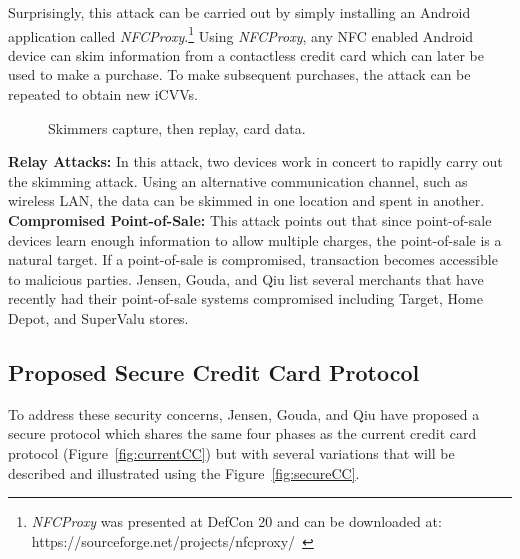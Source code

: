 \documentclass{sig-alternate}
\begin{document}
Surprisingly, this attack can be carried out by simply installing an Android application called \textit{NFCProxy}.\footnote{\textit{NFCProxy} was presented at DefCon 20 and can be downloaded at: https://sourceforge.net/projects/nfcproxy/~\cite{CC2016}}
Using \textit{NFCProxy}, any NFC enabled Android device can skim information from a contactless credit card which can later be used to make a purchase. To make subsequent purchases, the attack can be repeated to obtain new iCVVs.
\begin{figure}
\centering
{}
\caption{Skimmers capture, then replay, card data.~\cite{CC2016}}
\label{fig:skim}
\end{figure}
\vspace{2mm}\newline
\noindent\textbf{Relay Attacks:}
In this attack, two devices work in concert to rapidly carry out the skimming attack. Using an alternative communication channel, such as wireless LAN, the data can be skimmed in one location and spent in another.
\vspace{2mm}\newline
\noindent\textbf{Compromised Point-of-Sale:}
This attack points out that since point-of-sale devices learn enough information to allow multiple charges, the point-of-sale is a natural target. If a point-of-sale is compromised, transaction becomes accessible to malicious parties. Jensen, Gouda, and Qiu list several merchants that have recently had their point-of-sale systems compromised including Target, Home Depot, and SuperValu stores.

\subsection{Proposed Secure Credit Card Protocol}
To address these security concerns, Jensen, Gouda, and Qiu have proposed a secure protocol which shares the same four phases as the current credit card protocol (Figure~\ref{fig:currentCC}) but with several variations that will be described and illustrated using the Figure~\ref{fig:secureCC}.
\end{document}
